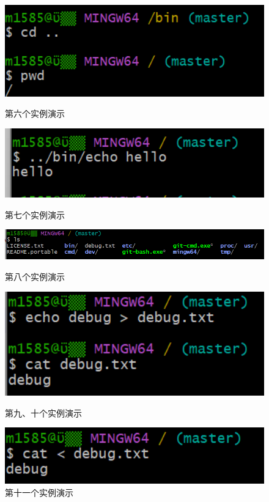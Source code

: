 \documentclass[a4paper, 12pt]{article}
\begin{document}
	\begin{figure}[h!]
		\includegraphics[width=1\textwidth]{6}
		\caption{第六个实例演示}
		\includegraphics[width=1\textwidth]{7}
		\caption{第七个实例演示}
		\includegraphics[width=1\textwidth]{8}
		\caption{第八个实例演示}
		\includegraphics[width=1\textwidth]{9}
		\caption{第九、十个实例演示}
		\includegraphics[width=1\textwidth]{10}
		\caption{第十一个实例演示}
	\end{figure}
\end{document}
